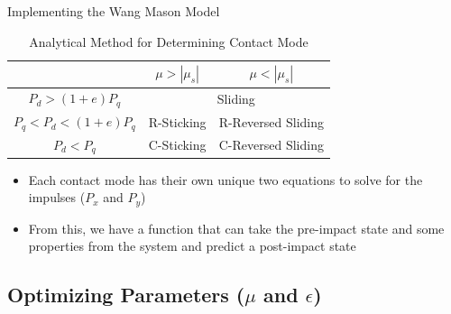 \begin{frame}{Implementing the Wang Mason Model}
\begin{table}[h!]
    \centering
    \begin{tabular}{|c|c|c|}
        \hline
         & $\mu > |\mu_s|$ & $\mu < |\mu_s|$ \\
         \hline
         $P_d > (1+e)P_q$  & \multicolumn{2}{c|}{Sliding} \\
         \hline
         $P_q < P_d < (1+e)P_q$ & R-Sticking & R-Reversed Sliding \\
         \hline
         $P_d < P_q$ & C-Sticking & C-Reversed Sliding\\
         \hline
    \end{tabular}
    \caption{Analytical Method for Determining Contact Mode}
\end{table}

\begin{itemize}
    \item Each contact mode has their own unique two equations to solve for the impulses ($P_x$ and $P_y$)
    \item From this, we have a function that can take the pre-impact state and some properties from the system and predict a post-impact state
\end{itemize}

\end{frame}

\subsection{Optimizing Parameters ($\mu$ and $\epsilon$)}

